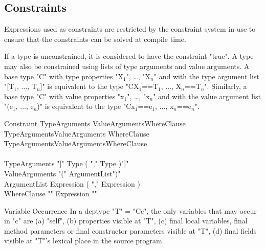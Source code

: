 \subsection{Constraints}

Expressions used as constraints are restricted by the
constraint system in use to ensure that the constraints can
be solved at compile time.

If a type is unconstrained, it is considered to have the
constraint \xcd"true".
A type may also be constrained using lists of type arguments and
value arguments.  A base type \xcd"C" with type properties
\xcdmath"X$_1$", \dots,
\xcdmath"X$_n$" and
with the type argument list
\xcdmath"[T$_1$, $\dots$, T$_n$]" is equivalent to the type
\xcdmath"C{X$_1$==T$_1$, $\dots$, X$_n$==T$_n$}".
Similarly, a base type \xcd"C" with value properties
\xcdmath"x$_1$", \dots,
\xcdmath"x$_n$" and
with the value argument list
\xcdmath"(e$_1$, $\dots$, e$_n$)" is equivalent to the type
\xcdmath"C{x$_1$==e$_1$, $\dots$, x$_n$==e$_n$}".

\def\withmath#1{\relax\ifmmode#1\else{$#1$}\fi}
\def\LL#1{\withmath{\lbrack\!\lbrack #1\rbrack\!\rbrack}}

\begin{grammar}
Constraint \: TypeArguments     ValueArguments\opt WhereClause\opt \\
           \| TypeArguments\opt ValueArguments     WhereClause\opt \\
           \| TypeArguments\opt ValueArguments\opt WhereClause     \\
           \\
TypeArguments    \:  \xcd"[" Type ( \xcd"," Type )\star \xcd"]" \\
ValueArguments   \:  \xcd"(" ArgumentList\opt \xcd")" \\
ArgumentList     \:  Expression ( \xcd"," Expression )\star \\
WhereClause        \: \xcd"{" Expression \xcd"}" \\
\end{grammar}

\begin{staticrule}{Variable Occurrence}
In a deptype \xcd"T" = \xcd"C{c}", the only variables that may
occur in \xcd"c" are (a)
\xcd"self", (b) properties visible at \xcd"T", (c) final local variables, final
method parameters or final constructor parameters visible at \xcd"T", (d)
final fields visible at \xcd"T"'s lexical place in the source program.  
\end{staticrule}

